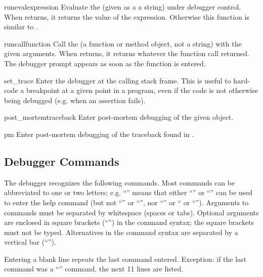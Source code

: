 \begin{funcdesc}{runeval}{expression}
Evaluate the  (given as a a string) under debugger
control.  When  returns, it returns the value of the
expression.  Otherwise this function is similar to
.
\end{funcdesc}

\begin{funcdesc}{runcall}{function}
Call the  (a function or method object, not a string)
with the given arguments.  When  returns, it returns
whatever the function call returned.  The debugger prompt appears as
soon as the function is entered.
\end{funcdesc}

\begin{funcdesc}{set_trace}{}
Enter the debugger at the calling stack frame.  This is useful to
hard-code a breakpoint at a given point in a program, even if the code
is not otherwise being debugged (e.g. when an assertion fails).
\end{funcdesc}

\begin{funcdesc}{post_mortem}{traceback}
Enter post-mortem debugging of the given  object.
\end{funcdesc}

\begin{funcdesc}{pm}{}
Enter post-mortem debugging of the traceback found in
.
\end{funcdesc}

\subsection{Debugger Commands}

The debugger recognizes the following commands.  Most commands can be
abbreviated to one or two letters; e.g. ``'' means that
either ``'' or ``'' can be used to enter the help
command (but not ``'' or ``'', nor ``'' or
`` or ``'').  Arguments to commands must be
separated by whitespace (spaces or tabs).  Optional arguments are
enclosed in square brackets (``\code{[]}'') in the command syntax; the
square brackets must not be typed.  Alternatives in the command syntax
are separated by a vertical bar (``\code{|}'').

Entering a blank line repeats the last command entered.  Exception: if
the last command was a ``'' command, the next 11 lines are
listed.

